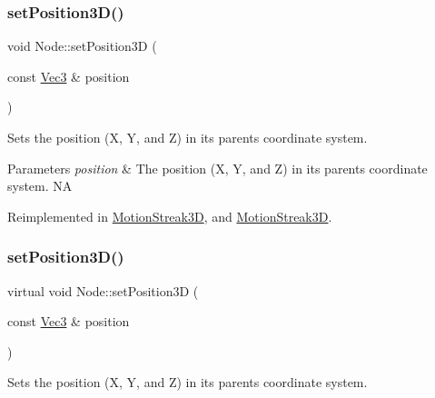 \mbox{\label{classNode_aa9eee02836d359b1469cf8a1484b485f}} 
\subsubsection{\texorpdfstring{set\+Position3\+D()}{setPosition3D()}\hspace{0.1cm}{\footnotesize\ttfamily [1/2]}}
{\footnotesize\ttfamily void Node\+::set\+Position3D (\begin{DoxyParamCaption}\item[{const \hyperlink{classVec3}{Vec3} \&}]{position }\end{DoxyParamCaption})\hspace{0.3cm}{\ttfamily [virtual]}}

Sets the position (X, Y, and Z) in its parent\textquotesingle{}s coordinate system.


\begin{DoxyParams}{Parameters}
{\em position} & The position (X, Y, and Z) in its parent\textquotesingle{}s coordinate system.  NA \\
\hline
\end{DoxyParams}


Reimplemented in \hyperlink{classMotionStreak3D_a34fac2c60502d074f8e40e99d01d9180}{Motion\+Streak3D}, and \hyperlink{classMotionStreak3D_a0a0d2f5f302ecaecb2e6652e5863f28f}{Motion\+Streak3D}.

\mbox{\label{classNode_ad3343ed96ab373ab30bef52123179a86}} 
\subsubsection{\texorpdfstring{set\+Position3\+D()}{setPosition3D()}\hspace{0.1cm}{\footnotesize\ttfamily [2/2]}}
{\footnotesize\ttfamily virtual void Node\+::set\+Position3D (\begin{DoxyParamCaption}\item[{const \hyperlink{classVec3}{Vec3} \&}]{position }\end{DoxyParamCaption})\hspace{0.3cm}{\ttfamily [virtual]}}

Sets the position (X, Y, and Z) in its parent\textquotesingle{}s coordinate system.


